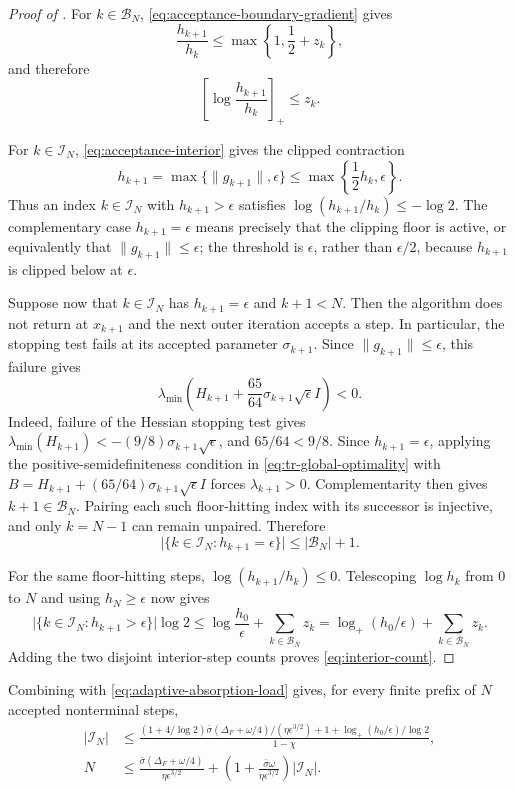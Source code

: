 \documentclass{article}
\begin{document}
\begin{proof}[Proof of ]
For $k\in\mathcal B_N$,
\eqref{eq:acceptance-boundary-gradient} gives
\[
    \frac{h_{k+1}}{h_k}
    \le\max\left\{1,\frac12+z_k\right\},
\]
and therefore
\[
    \left[\log\frac{h_{k+1}}{h_k}\right]_+
    \le z_k.
\]

For $k\in\mathcal I_N$,
\eqref{eq:acceptance-interior} gives the clipped contraction
\[
    h_{k+1}
    =\max\{\|g_{k+1}\|,\epsilon\}
    \le\max\left\{\frac12h_k,\epsilon\right\}.
\]
Thus an index $k\in\mathcal I_N$ with $h_{k+1}>\epsilon$ satisfies
$\log(h_{k+1}/h_k)\le-\log2$.  The complementary case
$h_{k+1}=\epsilon$ means precisely that the clipping floor is active,
or equivalently that $\|g_{k+1}\|\le\epsilon$; the threshold
is $\epsilon$, rather than $\epsilon/2$, because $h_{k+1}$ is clipped
below at $\epsilon$.

Suppose now that $k\in\mathcal I_N$ has $h_{k+1}=\epsilon$ and
$k+1<N$.  Then the algorithm does not return at $x_{k+1}$ and the next
outer iteration accepts a step.  In particular, the stopping test fails
at its accepted parameter $\sigma_{k+1}$.  Since
$\|g_{k+1}\|\le\epsilon$, this failure gives
\[
    \lambda_{\min}\!\left(
       H_{k+1}+\frac{65}{64}\sigma_{k+1}\sqrt\epsilon I
    \right)<0.
\]
Indeed, failure of the Hessian stopping test gives
$\lambda_{\min}(H_{k+1})<-(9/8)\sigma_{k+1}\sqrt\epsilon$, and
$65/64<9/8$.  Since $h_{k+1}=\epsilon$, applying the
positive-semidefiniteness condition in
\eqref{eq:tr-global-optimality} with
$B=H_{k+1}+(65/64)\sigma_{k+1}\sqrt\epsilon I$ forces
$\lambda_{k+1}>0$.  Complementarity then gives
$k+1\in\mathcal B_N$.  Pairing each such floor-hitting index with its
successor is injective, and only $k=N-1$ can remain unpaired.  Therefore
\[
    \bigl|\{k\in\mathcal I_N:h_{k+1}=\epsilon\}\bigr|
    \le|\mathcal B_N|+1.
\]

For the same floor-hitting steps,
$\log(h_{k+1}/h_k)\le0$.  Telescoping $\log h_k$ from $0$ to $N$ and
using $h_N\ge\epsilon$ now gives
\[
    \bigl|\{k\in\mathcal I_N:h_{k+1}>\epsilon\}\bigr|\log2
    \le
    \log\frac{h_0}{\epsilon}
       +\sum_{k\in\mathcal B_N}z_k
    =\log_+\!\left(h_0/\epsilon\right)
       +\sum_{k\in\mathcal B_N}z_k.
\]
Adding the two disjoint interior-step counts proves
\eqref{eq:interior-count}.
\end{proof}

Combining  with
\eqref{eq:adaptive-absorption-load} gives, for every finite prefix of
$N$ accepted nonterminal steps,
\begin{subequations}\label{eq:accepted-complexity}
\begin{align}
 |\mathcal I_N|
 &\le
 \frac{
  (1+4/\log2)
  \bar\sigma(\Delta_F+\omega/4)/(\eta\epsilon^{3/2})
  +1+\log_+(h_0/\epsilon)/\log2
 }{1-\chi},
 \label{eq:adaptive-interior-total}\\
 N
 &\le\frac{\bar\sigma(\Delta_F+\omega/4)}
              {\eta\epsilon^{3/2}}
 +\left(1+\frac{\bar\sigma\omega}{\eta\epsilon^{3/2}}\right)
  |\mathcal I_N|.
 \label{eq:adaptive-accepted-total}
\end{align}
\end{subequations}
\end{document}
